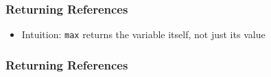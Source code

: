 \begin{frame}
  \frametitle{Returning References}
  \begin{itemize}
    \item Intuition: \texttt{max} returns the variable itself, not just its value
  \end{itemize}
\end{frame}

\begin{frame}
  \frametitle{Returning References}
\end{frame}


